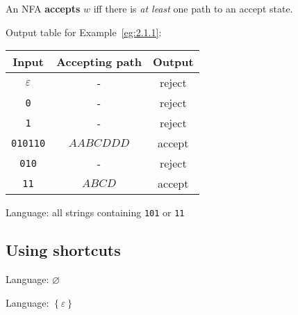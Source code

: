 \documentclass{notes}
\begin{document}
\begin{defn}
  An NFA {\boldmath \bfseries accepts} $w$ iff there is \textit{at least} one path to an accept state.
\end{defn}

\newpage

\begin{eg}
  Output table for Example~\ref{eg:2.1.1}:
  \begin{center}
    \begin{tabular}{ccc}
      Input & Accepting path & Output \\ 
      \hline
      $\varepsilon$ & - & reject \\ 
      \verb~0~ & - & reject \\ 
      \verb~1~ & - & reject \\ 
      \verb~010110~ & $AABCDDD$ & accept \\
      \verb~010~ & - & reject \\ 
      \verb~11~ & $ABCD$ & accept 
    \end{tabular}
  \end{center}
  
  \begin{center}
    Language: all strings containing \verb~101~ or \verb~11~
  \end{center}
\end{eg}

\subsection{Using shortcuts}

\begin{eg}
  Language: $\varnothing$
  
  \begin{center}
  \end{center}
\end{eg}

\begin{eg}
  Language: $\left \{ \varepsilon \right \}$

  \begin{center}
  \end{center}
\end{eg}
\end{document}
